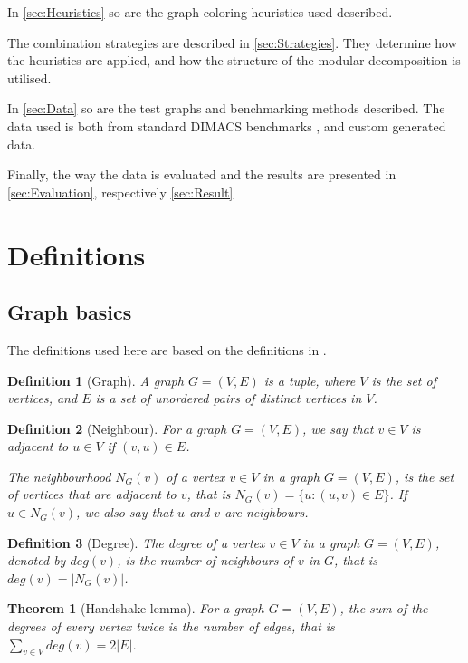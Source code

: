 \documentclass[a4paper]{article}
\newtheorem{theorem}{Theorem}[section]
\newtheorem{definition}{Definition}[section]
\begin{document}
In \autoref{sec:Heuristics} so are the graph coloring heuristics used described.

The combination strategies are described in \autoref{sec:Strategies}. They determine how 
the heuristics are applied, and how the structure of the modular decomposition is
utilised.

In \autoref{sec:Data} so are the test graphs and benchmarking methods described. The data
used is both from standard DIMACS benchmarks \cite{DIMACS}, and custom generated data.

Finally, the way the data is evaluated and the results are presented in 
\autoref{sec:Evaluation}, respectively \autoref{sec:Result}

\section{Definitions}
\label{sec:Definitions}

\subsection{Graph basics}
\label{sec:GraphBasics}

The definitions used here are based on the definitions in \cite{GraphBasics}. 

\begin{definition}[Graph]
    A graph $G = (V,E)$ is a tuple, where $V$ is the set of vertices, and $E$ is
    a set of unordered pairs of distinct vertices in $V$.
\end{definition}
\begin{definition}[Neighbour]
    For a graph $G = (V,E)$, we say that $v \in V$ is adjacent to 
    $u \in V$ if $(v,u) \in E$. 

    The neighbourhood $N_G(v)$ of a vertex $v \in V$ in a graph $G = (V,E)$,
    is the set of vertices that are adjacent to $v$, that is 
    $N_G(v) = \{u : (u,v) \in E \}$. If $u \in N_G(v)$, we also say
    that $u$ and $v$ are neighbours.
\end{definition}
\begin{definition}[Degree]
    The degree of a vertex $v \in V$ in a graph $G = (V,E)$, denoted by 
    $deg(v)$, is the number of neighbours of $v$ in $G$, that is 
    $deg(v) = |N_G(v)|$.
\end{definition}
\begin{theorem}[Handshake lemma]{\cite{GraphBasics}}
    For a graph $G = (V,E)$, the sum of the degrees of every vertex twice is
    the number of edges, that is $\sum_{v \in V} deg(v) = 2|E|$.
\end{theorem}
\end{document}
